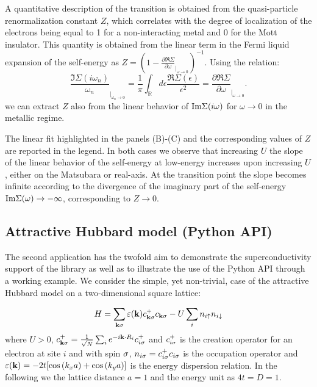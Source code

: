 \documentclass[edipack2.tex]{subfiles}
\begin{document}
A quantitative description of the transition is obtained from the
quasi-particle renormalization constant $Z$, which correlates with the degree of
localization of the electrons being equal to 1 for a non-interacting
metal and 0 for the Mott insulator. This quantity is obtained from the
linear term in the Fermi liquid expansion of the self-energy as
$Z=(1-\tfrac{\partial\Re\Sigma}{\partial\omega}_{|_{\omega\rightarrow
    0}})^{-1}$.
Using the relation:
$$
   \frac{\Im\Sigma(i\omega_n)}{\omega_n}_{|_{\omega_n\rightarrow 0}}=
   \frac{1}{\pi}\int_{\mathbb R}d\epsilon \frac{\Re\Sigma(\epsilon)}{\epsilon^2}=
   \frac{\partial\Re\Sigma}{\partial\omega}_{|_{\omega\rightarrow 0}}.
$$
we can extract $Z$ also from the linear behavior of ${\rm Im}\Sigma(i\omega)$ for 
$\omega\to0$ in the metallic regime.

The linear fit highlighted in the panels (B)-(C) and the corresponding values of $Z$ are reported in the legend.
In both cases we observe that increasing $U$ the slope of the linear behavior of the
self-energy at low-energy increases upon increasing $U$, either on the
Matsubara or real-axis. At the transition point the slope becomes
infinite according to the divergence of the imaginary part of
the self-energy  ${\rm Im}\Sigma(\omega) \rightarrow -\infty$,
corresponding to $Z\to 0$. 


\subsection{Attractive Hubbard model (Python API)}\label{SecExamplesAHM}
The second application has the twofold aim to demonstrate the
superconductivity support of the \NAME library as well as to
illustrate the use of the Python API through a working example.
We consider the simple, yet non-trivial, case of the attractive
Hubbard model on a two-dimensional square lattice:

$$
H = \sum_{{\bf k}\sigma} \varepsilon({\bf k})c^+_{{\bf k}\sigma}c_{{\bf k}\sigma} -U\sum_i n_{i\uparrow}n_{i\downarrow}
$$
where $U>0$, $c^+_{{\bf k}\sigma}=\tfrac{1}{\sqrt{N}}\sum_i e^{-i{\bf k}\cdot R_i} c^+_{i\sigma}$
and $c^+_{i\sigma}$ is the creation operator for an electron at site $i$
and with spin $\sigma$, $n_{i\sigma}=c^+_{i\sigma}c_{i\sigma}$ is the occupation
operator and $\varepsilon({\bf k})=-2t[\cos{(k_x a)}+ \cos{(k_y a)}]$ is the
energy dispersion relation. In the following we the lattice distance
$a=1$  and the energy unit as $4t=D=1$.
\end{document}

